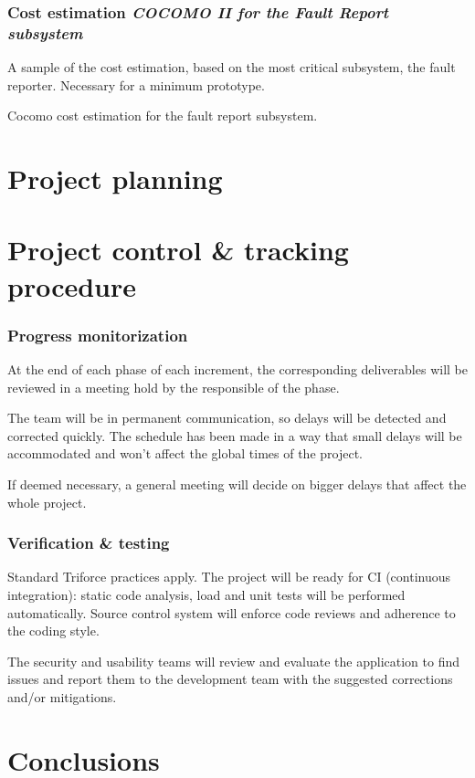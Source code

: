 \documentclass[10pt, compress,usetitleprogressbar,aspectratio=1610]{beamer}
\begin{document}
\begin{frame}
\frametitle{Cost estimation \hfill \emph{COCOMO II for the Fault Report subsystem}}
A sample of the cost estimation, based on the most critical subsystem, the fault reporter. Necessary for a minimum prototype.

\begin{table}[hbtp]

\caption{Cocomo cost estimation for the fault report subsystem.}
\label{tblFaultReportCost}
\end{table}
\end{frame}

\section{Project planning}

\section{Project control \& tracking procedure}

\begin{frame}
\frametitle{Progress monitorization}
At the end of each phase of each increment, the corresponding deliverables will be reviewed in a meeting hold by the responsible of the phase.

The team will be in permanent communication, so delays will be detected and corrected quickly. The schedule has been made in a way that small delays will be accommodated and won't affect the global times of the project.

If deemed necessary, a general meeting will decide on bigger delays that affect the whole project.
\end{frame}

\begin{frame}
\frametitle{Verification \& testing}
Standard Triforce practices apply. The project will be ready for CI (continuous integration): static code analysis, load and unit tests will be performed automatically. Source control system will enforce code reviews and adherence to the coding style.

The security and usability teams will review and evaluate the application to find issues and report them to the development team with the suggested corrections and/or mitigations.
\end{frame}

\section{Conclusions}
\end{document}
